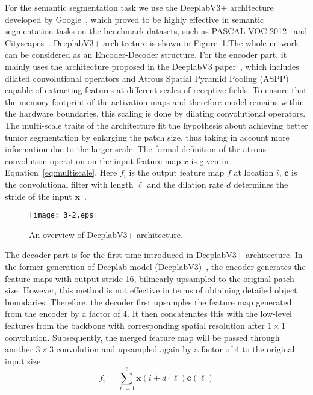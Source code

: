 For the semantic segmentation task we use the DeeplabV3+ architecture developed by Google~\cite{Chen2018}, which proved to be highly effective in semantic segmentation tasks on the benchmark datasets, such as PASCAL VOC 2012~\cite{Everingham2015} and Cityscapes~\cite{Cordts2016}. DeeplabV3+ architecture is shown in Figure~\ref{fig:3-2}.The whole network can be considered as an Encoder-Decoder structure. For the encoder part, it mainly uses the architecture proposed in the DeeplabV3 paper~\cite{Chen2017}, which includes dilated convolutional operators and Atrous Spatial Pyramid Pooling (ASPP) capable of extracting features at different scales of receptive fields. To ensure that the memory footprint of the activation maps and therefore model remains within the hardware boundaries, this scaling is done by dilating convolutional operators. The multi-scale traits of the architecture fit the hypothesis about achieving better tumor segmentation by enlarging the patch size, thus taking in account more information due to the larger scale. The formal definition of the atrous convolution operation on the input feature map $x$ is given in Equation~\eqref{eq:multiscale}. Here $f_{i}$ is the output feature map $f$ at location $i$, $\mathbf{c}$ is the convolutional filter with length $\ell$ and the dilation rate $d$ determines the stride of the input $\mathbf{x}$~\cite{Chen2018}.

\begin{figure}[!ht]
\centering
\texttt{[image: 3-2.eps]}
\caption{An overview of DeeplabV3+ architecture.}
\label{fig:3-2}
\end{figure}

The decoder part is for the first time introduced in DeeplabV3+ architecture. In the former generation of Deeplab model (DeeplabV3)~\cite{Chen2017}, the encoder generates the feature maps with output stride 16, bilinearly upsampled to the original patch size. However, this method is not effective in terms of obtaining detailed object boundaries. Therefore, the decoder first upsamples the feature map generated from the encoder by a factor of 4. It then concatenates this with the low-level features from the backbone with corresponding spatial resolution after $1 \times 1$ convolution. Subsequently, the merged feature map will be passed through another $3 \times 3$ convolution and upsampled again by a factor of 4 to the original input size.
\begin{equation}
f_{i}=\sum_{\ell=1}^{\ell} \mathbf{x}(i+d \cdot \ell) \mathbf{c}(\ell)
\label{eq:multiscale}
\end{equation}

